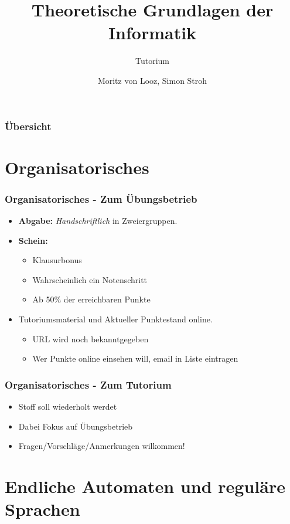 \documentclass{beamer}
\title{Theoretische Grundlagen der Informatik}
\subtitle{Tutorium}
\author{Moritz von Looz, Simon Stroh}
\institute[ITI]{Intitute für Theoretische Informatik}
\begin{document}
\begin{frame}
  \maketitle
\end{frame}

\begin{frame}
  \frametitle{Übersicht}
  \tableofcontents
\end{frame}

\section{Organisatorisches}
\begin{frame}
	\frametitle{Organisatorisches - Zum Übungsbetrieb}
	\begin{itemize}
		\item \textbf{Abgabe:} \emph{Handschriftlich} in Zweiergruppen.
		\item \textbf{Schein:} 
		\begin{itemize}
			\item Klausurbonus
			\item Wahrscheinlich ein Notenschritt
			\item Ab 50\% der erreichbaren Punkte
		\end{itemize}
		\item Tutoriumsmaterial und Aktueller Punktestand online.
		\begin{itemize}
			\item URL wird noch bekanntgegeben
			\item Wer Punkte online einsehen will, email in Liste eintragen
		\end{itemize}
	\end{itemize}
\end{frame}
\begin{frame}
	\frametitle{Organisatorisches - Zum Tutorium}
	\begin{itemize}
		\item Stoff soll wiederholt werdet
		\item Dabei Fokus auf Übungsbetrieb
		\item Fragen/Vorschläge/Anmerkungen wilkommen!
	\end{itemize}
\end{frame}
\section{Endliche Automaten und reguläre Sprachen}
\end{document}
